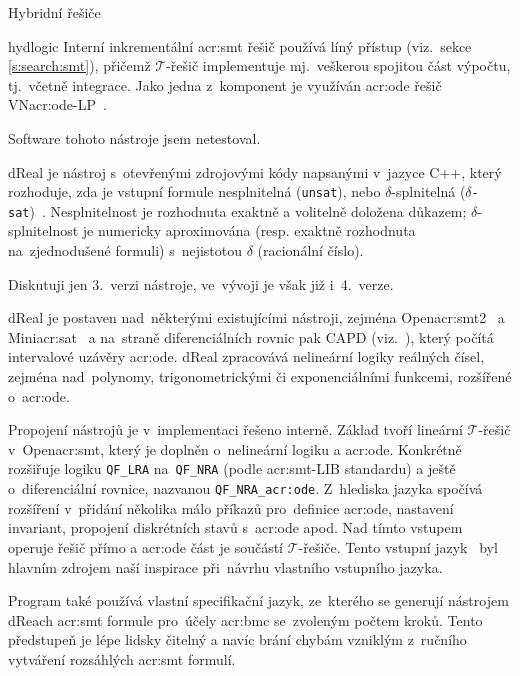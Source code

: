 \documentclass[thesis=M,czech]{FITthesis}[2012/06/26]
\newcommand{\acrlabel}[1]{acr:#1}
\newcommand{\acr}[1]{\acrshort{\acrlabel{#1}}}
\newcommand{\id}[1]{\texttt{#1}}
\newcommand{\cit}[1]{\cite{#1}}
\newcommand{\rf}[1]{\ref{#1}}
\newcommand{\set}[1]{\ensuremath{\mathcal{#1}}}
\begin{document}
\begin{section}{Hybridní řešiče}
\begin{paragraph}{hydlogic}
Interní inkrementální \acr{smt} řešič používá líný přístup
(viz.~sekce \rf{s:search:smt}),
přičemž \set{T}-řešič implementuje
mj.~veškerou spojitou část výpočtu,
tj.~včetně integrace.
Jako jedna z~komponent
je využíván \acr{ode} řešič VN\acr{ode}-LP~\cit{vnode-lp}.

Software tohoto nástroje jsem netestoval.
\end{paragraph} %


\begin{paragraph}{dReal}\label{p:search:hybrid:dreal}
je nástroj s~otevřenými zdrojovými kódy
napsanými v~jazyce C++, který rozhoduje,
zda je vstupní formule nesplnitelná (\id{unsat}),
nebo $\delta$-splnitelná
(\id{$\delta$-sat})~\cit{dreal-art}\cit{dreal-smo-art}\cit{dreal}.
Nesplnitelnost je rozhodnuta exaktně a volitelně doložena důkazem;
$\delta$-splnitelnost je numericky aproximována
(resp. exaktně rozhodnuta na~zjednodušené formuli)
s~nejistotou $\delta$ (racionální číslo).

Diskutuji jen 3.~verzi nástroje,
ve~vývoji je však již i~4.~verze.

dReal je postaven nad~některými existujícími nástroji,
zejména Open\acr{smt}2~\cit{opensmt} a Mini\acr{sat}~\cit{minisat}
a na~straně diferenciálních rovnic pak CAPD
(viz.~\cit{dreal-smo-art}\cit{dreal-smt-format-art}),
který počítá intervalové uzávěry \acr{ode}.
dReal zpracovává nelineární logiky
reálných čísel, zejména nad~polynomy,
trigonometrickými či exponenciálními funkcemi,
rozšířené o~\acr{ode}.

Propojení nástrojů je v~implementaci řešeno interně.
Základ tvoří lineární \set{T}-řešič v~Open\acr{smt},
který je doplněn o~nelineární logiku a \acr{ode}.
Konkrétně rozšiřuje logiku \id{QF\_\-LRA}
na~\id{QF\_\-NRA} (podle \acr{smt}-LIB standardu) a ještě
o~diferenciální rovnice, nazvanou \id{QF\_\-NRA\_\-\acr{ode}}.
Z~hlediska jazyka spočívá rozšíření v~přidání několika málo příkazů
pro~definice \acr{ode}, nastavení invariant,
propojení diskrétních stavů s~\acr{ode} apod.
Nad tímto vstupem operuje řešič přímo
a \acr{ode} část je součástí \set{T}-řešiče.
Tento vstupní jazyk~\cit{dreal-smt-format-art}
byl hlavním zdrojem naší inspirace
při~návrhu vlastního vstupního jazyka.

Program také používá vlastní specifikační jazyk,
ze~kterého se generují nástrojem dReach \acr{smt} formule
pro~účely \acr{bmc} se~zvoleným počtem kroků.
Tento předstupeň je lépe lidsky čitelný
a navíc brání chybám
vzniklým z~ručního vytváření rozsáhlých \acr{smt} formulí.


\end{paragraph}
\end{section}
\end{document}
